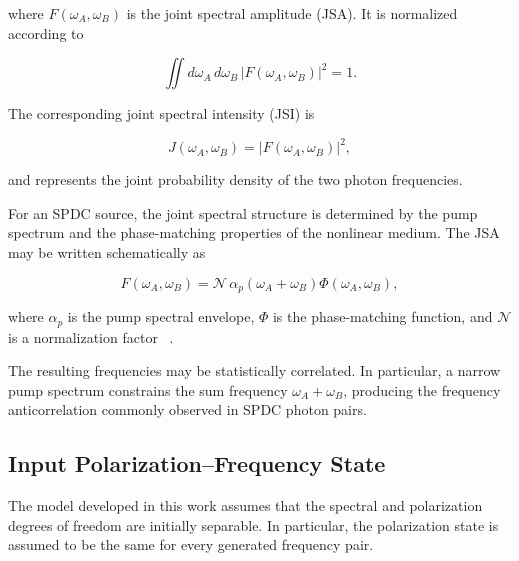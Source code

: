where \(F(\omega_A,\omega_B)\) is the joint spectral amplitude (JSA). It is
normalized according to

\begin{equation}
\iint
d\omega_A\,d\omega_B\,
|F(\omega_A,\omega_B)|^2
=
1.
\label{eq:joint_spectral_amplitude_normalization}
\end{equation}

The corresponding joint spectral intensity (JSI) is

\begin{equation}
J(\omega_A,\omega_B)
=
|F(\omega_A,\omega_B)|^2,
\label{eq:joint_spectral_intensity}
\end{equation}

and represents the joint probability density of the two photon frequencies.

For an SPDC source, the joint spectral structure is determined by the pump
spectrum and the phase-matching properties of the nonlinear medium. The JSA may
be written schematically as

\begin{equation}
F(\omega_A,\omega_B)
=
\mathcal{N}\,
\alpha_p(\omega_A+\omega_B)
\Phi(\omega_A,\omega_B),
\label{eq:spdc_joint_spectral_amplitude}
\end{equation}

where \(\alpha_p\) is the pump spectral envelope, \(\Phi\) is the phase-matching
function, and \(\mathcal{N}\) is a normalization factor
~\cite{grice_walmsley_spdc_spectral_1997}.

The resulting frequencies may be statistically correlated. In particular, a
narrow pump spectrum constrains the sum frequency
\(\omega_A+\omega_B\), producing the frequency anticorrelation commonly observed
in SPDC photon pairs.



\subsection{Input Polarization--Frequency State}
\label{subsec:input_polarization_frequency_state}

The model developed in this work assumes that the spectral and polarization
degrees of freedom are initially separable. In particular, the polarization state
is assumed to be the same for every generated frequency pair.

